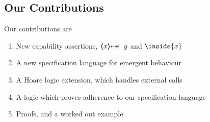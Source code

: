  

\subsection{Our Contributions}

Our contributions are

\begin{enumerate}
\item
New capability assertions, $\protectedFrom {x} {y}$  and $\inside{x}$ 
\item
A new specification language for emergent behaviour  
\item
A Hoare logic extension, which handles external calls
\item
A logic which proves adherence to our specification language
\item
Proofs, and a worked out example
\end{enumerate}
